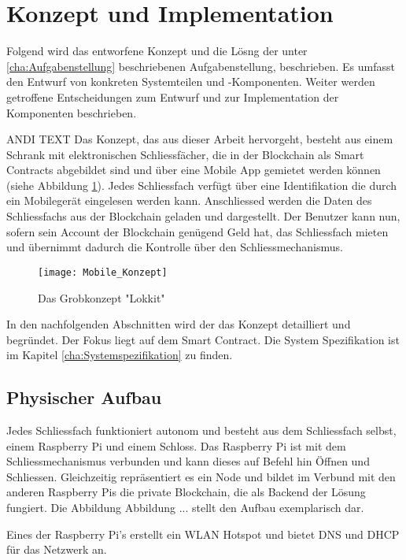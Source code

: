 \section{Konzept und Implementation}
\label{sec:Konzeption}
Folgend wird das entworfene Konzept und die Lösng der unter \ref{cha:Aufgabenstellung} beschriebenen Aufgabenstellung, beschrieben. Es umfasst den Entwurf von konkreten Systemteilen und -Komponenten. Weiter werden getroffene Entscheidungen zum Entwurf und zur Implementation der Komponenten beschrieben.

ANDI TEXT
Das Konzept, das aus dieser Arbeit hervorgeht, besteht aus einem Schrank mit elektronischen Schliessfächer, die in der Blockchain als Smart Contracts abgebildet sind und über eine Mobile App gemietet werden können (siehe Abbildung \ref{fig:Grobkonzept}). Jedes Schliessfach verfügt über eine Identifikation die durch ein Mobilegerät eingelesen werden kann. Anschliessed werden die Daten des Schliessfachs aus der Blockchain geladen und dargestellt. Der Benutzer kann nun, sofern sein Account der Blockchain genügend Geld hat, das Schliessfach mieten und übernimmt dadurch die Kontrolle über den Schliessmechanismus. 

\begin{figure}
\centering
\texttt{[image: Mobile\_Konzept]}
\caption{Das Grobkonzept "Lokkit"}
\label{fig:Grobkonzept}
\end{figure}

In den nachfolgenden Abschnitten wird der das Konzept detailliert und begründet. Der Fokus liegt auf dem Smart Contract. Die System Spezifikation ist im Kapitel \ref{cha:Systemspezifikation} zu finden.

\subsection{Physischer Aufbau}

Jedes Schliessfach funktioniert autonom und besteht aus dem Schliessfach selbst, einem Raspberry Pi und einem Schloss. Das Raspberry Pi ist mit dem Schliessmechanismus verbunden und kann dieses auf Befehl hin Öffnen und Schliessen. Gleichzeitig repräsentiert es ein Node und bildet im Verbund mit den anderen Raspberry Pis die private Blockchain, die als Backend der Lösung fungiert. Die Abbildung Abbildung ... stellt den Aufbau exemplarisch dar.

Eines der Raspberry Pi's erstellt ein WLAN Hotspot und bietet DNS und DHCP für das Netzwerk an.

